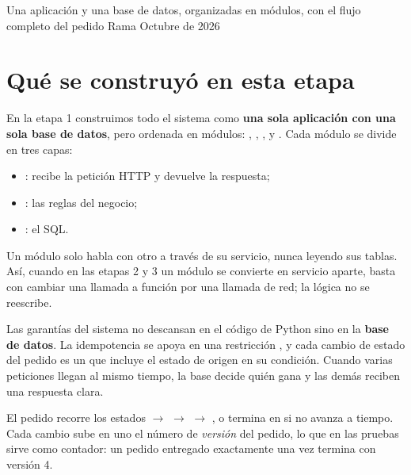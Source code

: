 \documentclass[11pt]{article}
\begin{document}
%
  {Una aplicación y una base de datos, organizadas en módulos, con el flujo completo del pedido}%
  {Rama }{Octubre de 2026}

\tableofcontents
\newpage

\section{Qué se construyó en esta etapa}

En la etapa 1 construimos todo el sistema como \textbf{una sola aplicación con una sola base de
datos}, pero ordenada en módulos: , , ,  y
. Cada módulo se divide en tres capas:

\begin{itemize}
  \item {}: recibe la petición HTTP y devuelve la respuesta;
  \item {}: las reglas del negocio;
  \item {}: el SQL.
\end{itemize}

Un módulo solo habla con otro a través de su servicio, nunca leyendo sus tablas. Así, cuando en las
etapas 2 y 3 un módulo se convierte en servicio aparte, basta con cambiar una llamada a función por
una llamada de red; la lógica no se reescribe.

\begin{nota}
Las garantías del sistema no descansan en el código de Python sino en la \textbf{base de datos}.
La idempotencia se apoya en una restricción , y cada cambio de estado del pedido es un
 que incluye el estado de origen en su condición. Cuando varias peticiones llegan al
mismo tiempo, la base decide quién gana y las demás reciben una respuesta clara.
\end{nota}

El pedido recorre los estados
 $\rightarrow$  $\rightarrow$  $\rightarrow$
, o termina en  si no avanza a tiempo. Cada cambio sube en uno el
número de \emph{versión} del pedido, lo que en las pruebas sirve como contador: un pedido entregado
exactamente una vez termina con versión 4.
\end{document}
